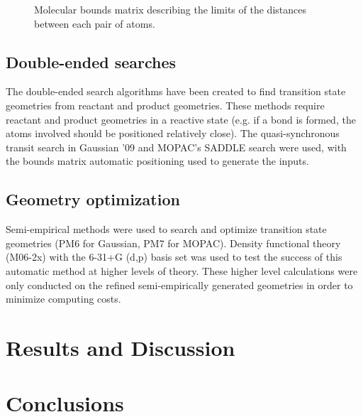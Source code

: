 \documentclass[11pt]{article}
\begin{document}
\begin{figure}[htbp]
\begin{center}

\caption{Molecular bounds matrix describing the limits of the distances between each pair of atoms.}
\label{default}
\end{center}
\end{figure}


\subsection{Double-ended searches}
The double-ended search algorithms have been created to find transition state geometries from reactant and product geometries. These methods require reactant and product geometries in a reactive state (e.g. if a bond is formed, the atoms involved should be positioned relatively close). The quasi-synchronous transit search in Gaussian '09 and MOPAC's SADDLE search were used, with the bounds matrix automatic positioning used to generate the inputs.

\subsection{Geometry optimization}
Semi-empirical methods were used to search and optimize transition state geometries (PM6 for Gaussian, PM7 for MOPAC). Density functional theory (M06-2x) with the 6-31+G (d,p) basis set was used to test the success of this automatic method at higher levels of theory. These higher level calculations were only conducted on the refined semi-empirically generated geometries in order to minimize computing costs.

\section{Results and Discussion}

\section{Conclusions}
\end{document}
